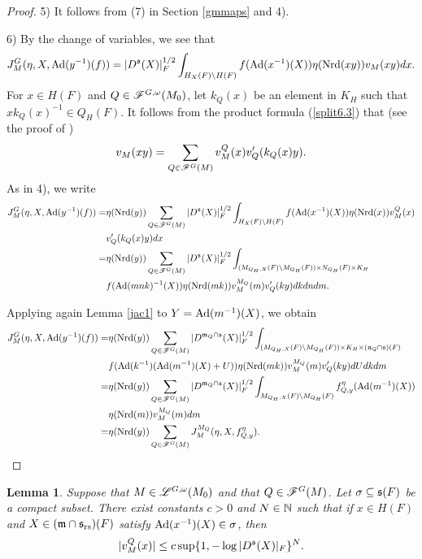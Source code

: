 \documentclass[a4paper]{amsart}
\newcommand{\fm}{{\mathfrak{m}}} \newcommand{\fn}{{\mathfrak{n}}}\newcommand{\fo}{{\mathfrak{o}}} \newcommand{\fp}{{\mathfrak{p}}}
\newtheorem{lem}[thm]{Lemma}
\theoremstyle{definition}
\theoremstyle{remark}
\numberwithin{equation}{subsection}
\begin{document}
\begin{proof}
5) It follows from (7) in Section \ref{gmmaps} and 4). 

6) By the change of variables, we see that
$$ J_M^G(\eta, X, {\mathrm{Ad}}(y^{-1})(f))=|D^{\mathfrak{s}}(X)|_F^{1/2} \int_{H_X(F)\backslash H(F)} f({\mathrm{Ad}}(x^{-1})(X)) \eta({\mathrm{Nrd}}(xy)) v_M(xy) dx.  $$
For $x\in H(F)$ and $Q\in\mathscr{F}^{G,\omega}(M_0)$, let $k_Q(x)$ be an element in $K_H$ such that $xk_Q(x)^{-1}\in Q_H(F)$. It follows from the product formula (\ref{split6.3}) that (see the proof of \cite[Lemma 8.2]{MR625344})
$$ v_M(xy)=\sum_{Q\in\mathscr{F}^G(M)} v_M^Q(x) v'_Q(k_Q(x)y).  $$
As in 4), we write
\[\begin{split}
J_M^G(\eta, X, {\mathrm{Ad}}(y^{-1})(f))=&\eta({\mathrm{Nrd}}(y)) \sum_{Q\in\mathscr{F}^G(M)} |D^{\mathfrak{s}}(X)|_F^{1/2} \int_{H_X(F)\backslash H(F)} f({\mathrm{Ad}}(x^{-1})(X)) \eta({\mathrm{Nrd}}(x)) v_M^Q(x) \\ 
&v'_Q(k_Q(x)y) dx \\
=&\eta({\mathrm{Nrd}}(y)) \sum_{Q\in\mathscr{F}^G(M)} |D^{\mathfrak{s}}(X)|_F^{1/2} \int_{(M_{Q_H,X}(F)\backslash M_{Q_H}(F))\times N_{Q_H}(F)\times K_H} \\ 
&f({\mathrm{Ad}}(mnk)^{-1}(X)) \eta({\mathrm{Nrd}}(mk)) v_M^{M_Q}(m) v'_Q(ky) dk dn dm. 
\end{split}\]

Applying again Lemma \ref{jac1} to $Y={\mathrm{Ad}}(m^{-1})(X)$, we obtain
\[\begin{split}
J_M^G(\eta, X, \Ad(y^{-1})(f))=&\eta(\Nrd(y)) \sum_{Q\in\msf^G(M)} |D^{\fm_Q\cap\fs}(X)|_F^{1/2} \int_{(M_{Q_H,X}(F)\bs M_{Q_H}(F))\times K_H\times (\fn_Q\cap\fs)(F)} \\ 
&f(\Ad(k^{-1})(\Ad(m^{-1})(X)+U)) \eta(\Nrd(mk)) v_M^{M_Q}(m) v'_Q(ky) dU dk dm \\ 
=&\eta(\Nrd(y)) \sum_{Q\in\msf^G(M)} |D^{\fm_Q\cap\fs}(X)|_F^{1/2} \int_{M_{Q_H,X}(F)\bs M_{Q_H}(F)} f_{Q,y}^\eta(\Ad(m^{-1})(X)) \\ 
&\eta(\Nrd(m)) v_M^{M_Q}(m) dm \\ 
=&\eta(\Nrd(y)) \sum_{Q\in\msf^G(M)} J_M^{M_Q}(\eta, X, f_{Q,y}^\eta).
\end{split}\]
\end{proof}

\begin{lem}\label{lemIII.5.1}
Suppose that $M\in\mathscr{L}^{G,\omega}(M_0)$ and that $Q\in\mathscr{F}^G(M)$. Let $\sigma\subseteq{\mathfrak{s}}(F)$ be a compact subset. There exist constants $c>0$ and $N\in{\mathbb {N}}$ such that if $x\in H(F)$ and $X\in(\fm\cap\fs_\rs)(F)$ satisfy ${\mathrm{Ad}}(x^{-1})(X)\in\sigma$, then
$$ |v_M^Q(x)|\leq c\sup\{1, -\log |D^{\mathfrak{s}}(X)|_F\}^N. $$
\end{lem}
\end{document}
